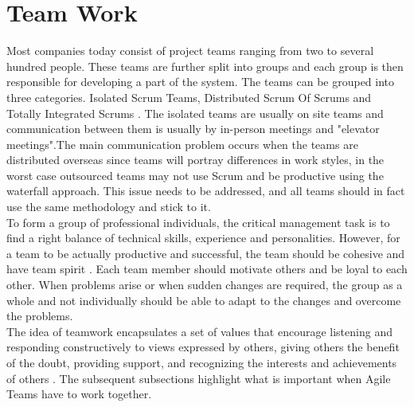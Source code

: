 \documentclass[sigplan,screen]{acmart}
\begin{document}
\section{Team Work}
Most companies today consist of project teams ranging from two to several hundred people. These teams are further split into groups and each group is then responsible for developing a part of the system. The teams can be grouped into three categories. Isolated Scrum Teams, Distributed Scrum Of Scrums and Totally Integrated Scrums \cite{Jeff}. 
The isolated teams are usually on site teams and communication between them is usually by in-person meetings and "elevator meetings".The main communication problem occurs when the teams are distributed overseas since teams will portray differences in work styles, in the worst case outsourced teams may not use Scrum and be productive using the waterfall approach. This issue needs to be addressed, and all teams should in fact use the same methodology and stick to it.\\
To form a group of professional individuals, the critical management task is to find a right balance of technical skills, experience and personalities. However, for a team to be actually productive and successful, the team should be cohesive and have team spirit \cite{Somerville}. Each team member should motivate others and  be loyal to each other. When problems arise or when sudden changes are required, the group as a whole and not individually should be able to adapt to the changes and overcome the problems.\\
The idea of teamwork encapsulates a set of values that encourage listening and responding constructively to views expressed by others, giving others the benefit of the doubt, providing support, and recognizing the interests and achievements of others \cite{Moe}.
The subsequent subsections highlight what is important when Agile Teams have to work together. 
\end{document}
